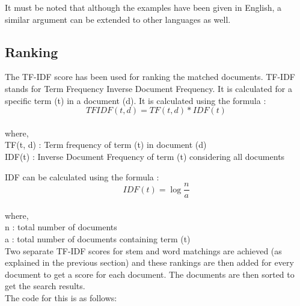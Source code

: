 \documentclass[12pt]{article}
\begin{document}
	It must be noted that although the examples have been given in English, a similar argument can be extended to other languages as well. \\
	
	\subsection{Ranking}
	
	The TF-IDF score has been used for ranking the matched documents. TF-IDF stands for Term Frequency Inverse Document Frequency. It is calculated for a specific term (t) in a document (d). It is calculated using the formula :\\
	\[TFIDF(t, d) = TF(t, d) * IDF(t)\]\\
	where, \\
	TF(t, d) : Term frequency of term (t) in document (d) \\
	IDF(t) : Inverse Document Frequency of term (t) considering all documents
	
	IDF can be calculated using the formula :
	\[IDF(t) = \log\frac{n}{a}\]\\
	where,\\
	n : total number of documents\\
	a : total number of documents containing term (t)\\
	
	Two separate TF-IDF scores for stem and word matchings are achieved (as explained in the previous section) and these rankings are then added for every document to get a score for each document. The documents are then sorted to get the search results.\\
	
	The code for this is as follows:\\
	
\end{document}

